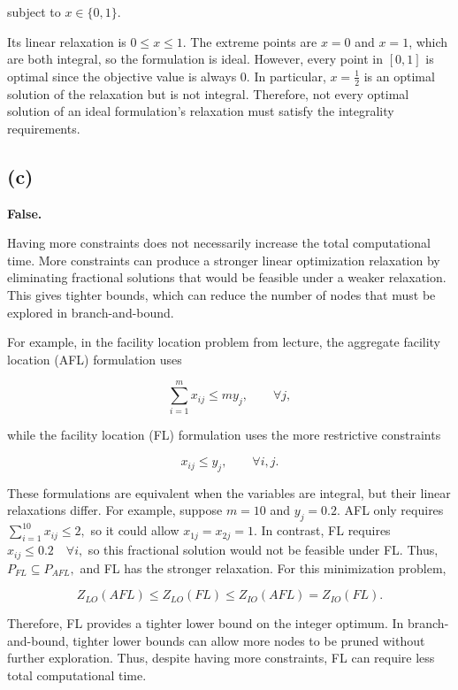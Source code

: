 \documentclass{article}
\begin{document}
subject to $
x \in \{0,1\}.
$

Its linear relaxation is $
0 \leq x \leq 1.
$ The extreme points are $x=0$ and $x=1$, which are both integral, so the formulation is ideal. However, every point in $[0,1]$ is optimal since the objective value is always $0$. In particular, $
x=\frac{1}{2}
$ is an optimal solution of the relaxation but is not integral. Therefore, not every optimal solution of an ideal formulation's relaxation must satisfy the integrality requirements.



\vspace{5mm}
\subsection*{(c)}

\textbf{False.}

Having more constraints does not necessarily increase the total computational time. More constraints can produce a stronger linear optimization relaxation by eliminating fractional solutions that would be feasible under a weaker relaxation. This gives tighter bounds, which can reduce the number of nodes that must be explored in branch-and-bound.

For example, in the facility location problem from lecture, the aggregate facility location (AFL) formulation uses

$$
\sum_{i=1}^{m} x_{ij} \leq m y_j, \qquad \forall j,
$$

while the facility location (FL) formulation uses the more restrictive constraints

$$
x_{ij} \leq y_j, \qquad \forall i,j.
$$

These formulations are equivalent when the variables are integral, but their linear relaxations differ. For example, suppose $m=10$ and $y_j=0.2$. AFL only requires $
\sum_{i=1}^{10} x_{ij} \leq 2,
$ so it could allow $x_{1j}=x_{2j}=1$. In contrast, FL requires $
x_{ij} \leq 0.2 \quad \forall i,
$ so this fractional solution would not be feasible under FL. Thus, $
P_{FL} \subseteq P_{AFL},
$ and FL has the stronger relaxation. For this minimization problem,

$$
Z_{LO}(AFL) \leq Z_{LO}(FL) \leq Z_{IO}(AFL)=Z_{IO}(FL).
$$

Therefore, FL provides a tighter lower bound on the integer optimum. In branch-and-bound, tighter lower bounds can allow more nodes to be pruned without further exploration. Thus, despite having more constraints, FL can require less total computational time.
\end{document}
